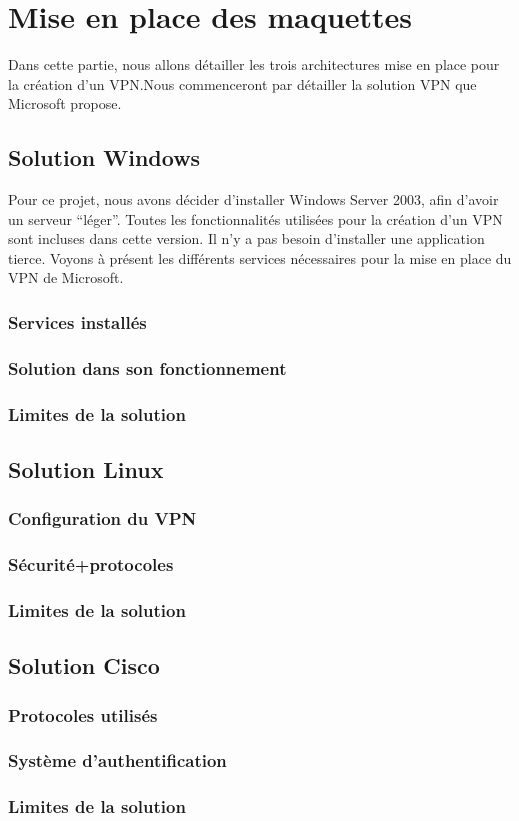 \section{Mise en place des maquettes}

	Dans cette partie, nous allons détailler les trois architectures mise en place pour la création d'un VPN.Nous commenceront par détailler la solution VPN que Microsoft propose.

\subsection{Solution Windows}

	Pour ce projet, nous avons décider d'installer Windows Server 2003, afin d'avoir un serveur ``léger''. Toutes les fonctionnalités utilisées pour la création d'un VPN sont incluses dans cette version. Il n'y a pas besoin d'installer une application tierce.
	Voyons à présent les différents services nécessaires pour la mise en place du VPN de Microsoft.

\subsubsection{Services installés}

	
\subsubsection{Solution dans son fonctionnement}
\subsubsection{Limites de la solution}

\subsection{Solution Linux}
\subsubsection{Configuration du VPN}
\subsubsection{Sécurité+protocoles}
\subsubsection{Limites de la solution}

\subsection{Solution Cisco}
\subsubsection{Protocoles utilisés}
\subsubsection{Système d'authentification}
\subsubsection{Limites de la solution}



\pagebreak
